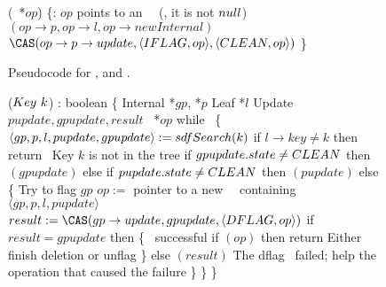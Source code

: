\begin{figure*}
\begin{code}
(\IFlag\ *$op$) \{\ul
\n     {}:  $op$ points to an \IFlag\ \record\  (\ie, it is not $null$)\nl
       $(op\rightarrow p, op\rightarrow l, op\rightarrow newInternal)$ \label{ichild-cas}\nl
       $\CAS(op\rightarrow p\rightarrow update, \langle \insertflag, op \rangle, \langle \clean, op\rangle)$  \label{iunflag-cas}\nl
\p
\}
\end{code}
\caption{\label{code2}Pseudocode for ,  and .}
\end{figure*}

\begin{figure*}
\begin{code}
\firstline
{}($Key\ k$) : boolean \{\nl
\n Internal *$gp$, *$p$\nl
   Leaf *$l$\nl
   Update $pupdate, gpupdate, result$\nl
   \DFlag\ *$op$\bl\nl
   while \TRUE\ \{ \nl
\n     $\langle gp, p, l, pupdate, gpupdate \rangle := sdf{Search}(k)$\label{del-search}\nl
       if $l\rightarrow key \neq k$ then return \FALSE\ \tabtabcom Key $k$ is not in the tree\label{delete-false}\nl
       if $gpupdate.state \neq C\scriptsize LEAN \normalsize$ then $(gpupdate)$ \label{del-help-unclean-1}\nl
       else if $pupdate.state \neq C\scriptsize LEAN \normalsize$ then $(pupdate)$\label{del-help-unclean-2}\nl
       else \{ \tabtabcom Try to flag $gp$\nl
\n          $op :=$ pointer to a new \DFlag\ \record\  containing $\langle gp, p, l, pupdate \rangle$\label{new-DFlag}\nl
            $result := \CAS(gp\rightarrow update, gpupdate, \langle \deleteflag, op \rangle)$ \label{dflag-cas}\nl
            if $result = gpupdate$ then \{ \tabtabcom \CAS\ successful \nl
\n             if $(op)$ then return \TRUE \label{delete-true} \tabtabcom Either finish deletion or unflag\nl
\p          \}\nl                 
            else $(result)$ \tabcom The dflag \CAS\ failed; help the operation that caused the failure \label{del-help-after-failure}\nl%
\p     \}\nl
\p \}\nl
\p
\}\bl
\nl


\end{code}
\end{figure*}
